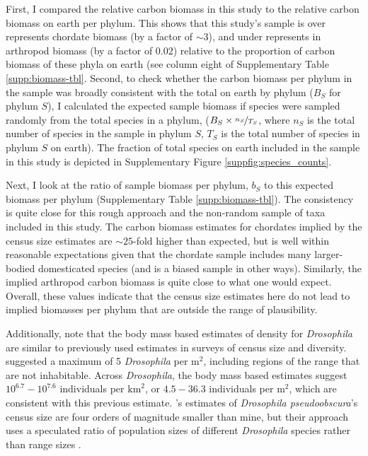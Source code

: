 \documentclass[11pt]{article}
\begin{document}
First, I compared the relative carbon biomass in this study to the relative
carbon biomass on earth per phylum. This shows that this study's sample is over
represents chordate biomass (by a factor of $\mathord{\sim}3$), and under represents
in arthropod biomass (by a factor of $0.02$) relative to the proportion of
carbon biomass of these phyla on earth (see column eight of Supplementary Table
\ref{supp:biomass-tbl}. Second, to check whether the carbon biomass per phylum
in the sample was broadly consistent with the total on earth by phylum ($B_S$
for phylum $S$), I calculated the expected sample biomass if species were
sampled randomly from the total species in a phylum, ($B_S \times
\nicefrac{n_S}{T_S}$, where $n_S$ is the total number of species in the sample
in phylum $S$, $T_S$ is the total number of species in phylum $S$ on earth).
The fraction of total species on earth included in the sample in this study is
depicted in Supplementary Figure \ref{suppfig:species_counts}.  

Next, I look at the ratio of sample biomass per phylum, $b_S$ to this expected
biomass per phylum (Supplementary Table \ref{supp:biomass-tbl}). The
consistency is quite close for this rough approach and the non-random sample of
taxa included in this study. The carbon biomass estimates for chordates implied
by the census size estimates are $\mathord{\sim}25$-fold higher than expected, but is
well within reasonable expectations given that the chordate sample includes
many larger-bodied domesticated species (and is a biased sample in other ways).
Similarly, the implied arthropod carbon biomass is quite close to what one
would expect. Overall, these values indicate that the census size estimates
here do not lead to implied biomasses per phylum that are outside the range of
plausibility.

Additionally, note that the body mass based estimates of density for
\emph{Drosophila} are similar to previously used estimates in surveys of census
size and diversity. \textcite{Nei1984-zi} suggested a maximum of 5
\emph{Drosophila} per $\text{m}^2$, including regions of the range that are not
inhabitable. Across \emph{Drosophila}, the body mass based estimates suggest
$10^{6.7}-10^{7.6}$ individuals per $\text{km}^2$, or $4.5-36.3$ individuals
per $\text{m}^2$, which are consistent with this previous estimate.
\citeauthor{Nei1984-zi}'s estimates of \emph{Drosophila pseudoobscura}'s census
size are four orders of magnitude smaller than mine, but their approach uses a
speculated ratio of population sizes of different \emph{Drosophila} species
rather than range sizes \parencite[p. 81]{Nei1984-zi}.
\end{document}
